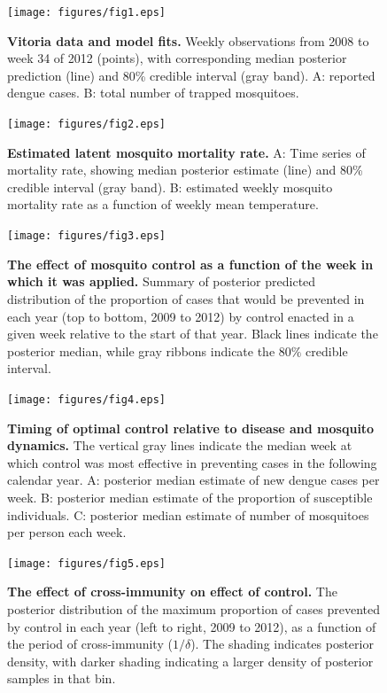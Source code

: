 \documentclass[10pt,letterpaper]{article}
\begin{document}
\begin{figure}[!h]
\texttt{[image: figures/fig1.eps]}
\caption{{\bf Vitoria data and model fits.}
Weekly observations from 2008 to week 34 of 2012 (points), with corresponding median posterior prediction (line) and 80\% credible interval (gray band). A: reported dengue cases. B: total number of trapped mosquitoes.
}
\label{timeseries}
\end{figure}

\begin{figure}[!h]
\texttt{[image: figures/fig2.eps]}
\caption{{\bf Estimated latent mosquito mortality rate.}
A: Time series of mortality rate, showing median posterior estimate (line) and 80\% credible interval (gray band). B: estimated weekly mosquito mortality rate as a function of weekly mean temperature.
}
\label{mortality}
\end{figure}

\begin{figure}[!h]
\texttt{[image: figures/fig3.eps]}
\caption{{\bf The effect of mosquito control as a function of the week in which it was applied.}
Summary of posterior predicted distribution of the proportion of cases that would be prevented in each year (top to bottom, 2009 to 2012) by control enacted in a given week relative to the start of that year. Black lines indicate the posterior median, while gray ribbons indicate the $80\%$ credible interval.
}
\label{control}
\end{figure}

\begin{figure}[!h]
\texttt{[image: figures/fig4.eps]}
\caption{{\bf Timing of optimal control relative to disease and mosquito dynamics.}
The vertical gray lines indicate the median week at which control was most effective in preventing cases in the following calendar year. A: posterior median estimate of new dengue cases per week. B: posterior median estimate of the proportion of susceptible individuals. C: posterior median estimate of number of mosquitoes per person each week.
}
\label{timing}
\end{figure}

\begin{figure}[!h]
\texttt{[image: figures/fig5.eps]}
\caption{{\bf The effect of cross-immunity on effect of control.}
The posterior distribution of the maximum proportion of cases prevented by control in each year (left to right, 2009 to 2012), as a function of the period of cross-immunity ($1/\delta$). The shading indicates posterior density, with darker shading indicating a larger density of posterior samples in that bin.
}
\label{immunity}
\end{figure}
\end{document}
